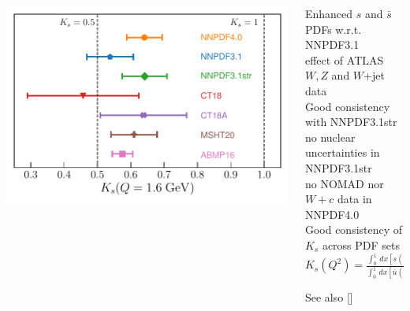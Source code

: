 \documentclass{beamer}
\begin{document}
\begin{frame}
\begin{columns}[c]
  \begin{column}{0.5\textwidth}
   \centering
   \includegraphics[width=\columnwidth]{plots/ks-Q_1p6GeV}\\
  \end{column}
  \begin{column}{0.5\textwidth}
   \centering
   \footnotesize
   Enhanced $s$ and $\bar{s}$ PDFs w.r.t. NNPDF3.1\\
   {\scriptsize effect of ATLAS $W,Z$ and $W$+jet data}\\
   \vspace{0.2cm}
   Good consistency with NNPDF3.1str\\
   {\scriptsize no nuclear uncertainties in NNPDF3.1str}\\
   {\scriptsize no NOMAD nor $W+c$ data in NNPDF4.0}\\
   \vspace{0.2cm}
   Good consistency of $K_s$ across PDF sets\\ 
   \vspace{0.1cm}
   $K_s(Q^2)=\frac{\int_0^1\,dx[s(x,Q^2)+\bar{s}(x,Q^2)]}{\int_0^1\,dx[\bar{u}(x,Q^2)+\bar{d}(x,Q^2)]}$\\
   \begin{flushright}
    {\tiny{See also [{\color{salmon}{EPJ\,C80\,(2020)\,1168}}]}}
   \end{flushright}
  \end{column}
 \end{columns} 
\end{frame}
\end{document}
